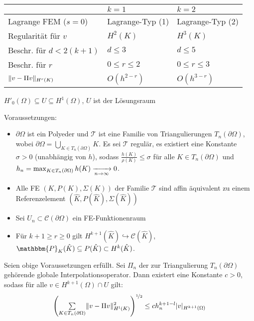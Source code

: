 \documentclass{cheat-sheet}
\newcommand{\Cont}{\mathcal{C}} %
\newcommand{\bOmega}{\partial \Omega} %
\newcommand{\Poly}{\mathbbm{P}} %
\begin{document}
\begin{bsp}
  \begin{tabular}{l l l}
    & $k=1$ & $k=2$ \\ \hline
    Lagrange FEM ($s = 0$) & Lagrange-Typ (1) & Lagrange-Typ (2) \\
    Regularität für $v$ & $H^2(K)$ & $H^3(K)$ \\
    Beschr. für $d < 2 (k+1)$ & $d \leq 3$ & $d \leq 5$ \\
    Beschr. für $r$ & $0 \leq r \leq 2$ & $0 \leq r \leq 3$ \\
    $\lVert v - \Pi v\rVert_{H^r(K)}$ & $O(h^{2-r})$ & $O(h^{3-r})$
  \end{tabular}
\end{bsp}


$H'_0(\Omega) \subseteq U \subseteq H^1(\Omega)$, $U$ ist der Lösungsraum

Voraussetzungen:

\begin{itemize}
  \item $\bOmega$ ist ein Polyeder und $\mathcal{T}$ ist eine Familie von Triangulierungen $T_n(\bOmega)$, wobei $\bOmega = \bigcup_{K \in T_n(\bOmega)} K$.
  Es sei $\mathcal{T}$ regulär, \dh{} es existiert eine Konstante $\sigma > 0$ (unabhängig von $h$), sodass $\tfrac{h(K)}{\rho(K)} \leq \sigma$ für alle $K \in T_n(\bOmega)$ und $h_n = \max_{K \in T_n(\bOmega)} h(K) \xra[n \to \infty]{} 0$.
  \item Alle FE $(K, P(K), \Sigma(K))$ der Familie $\mathcal{T}$ sind affin äquivalent zu einem Referenzelement $(\hat{K}, P(\hat{K}), \Sigma(\hat{K}))$
  \item Sei $U_n \subset \Cont(\bOmega)$ ein FE-Funktionenraum
  \item Für $k+1 \geq r \geq 0$  gilt $H^{k+1}(\hat{K}) \hookrightarrow \Cont(\hat{K})$, $\Poly_K(\hat{K}) \subseteq P(\hat{K}) \subset H^k(\hat{K})$.
\end{itemize}

\begin{satz}
  Seien obige Voraussetzungen erfüllt.
  Sei $\Pi_n$ der zur Triangulierung $T_n(\bOmega)$ gehörende globale Interpolationsoperator.
  Dann existert eine Konstante $c > 0$, sodass für alle $v \in H^{k+1}(\Omega) \cap U$ gilt:
  \[
    \left( \sum_{K \in T_n(\bOmega)} \norm{v - \Pi v}^2_{H^l(K)} \right)^{\nicefrac{1}{2}} \leq c h_n^{k+1-l} \abs{v}_{H^{k+1}(\Omega)}
  \]
\end{satz}
\end{document}
